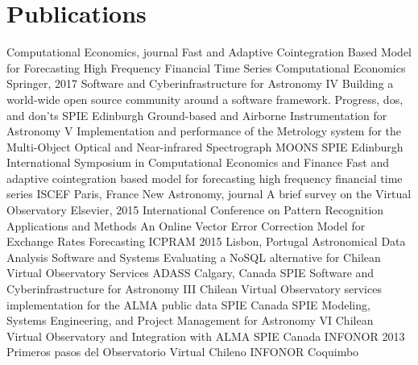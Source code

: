 \documentclass[11pt,a4paper]{moderncv}
\begin{document}
\section{Publications}
	{Computational Economics, journal}
	{Fast and Adaptive Cointegration Based Model for Forecasting High Frequency Financial Time Series}
	{Computational Economics}
	{Springer, 2017}
	{}
	{Software and Cyberinfrastructure for Astronomy IV}
	{Building a world-wide open source community around a software framework. Progress, dos, and don'ts}
	{SPIE}
	{Edinburgh}
	{}
	{Ground-based and Airborne Instrumentation for Astronomy V}
	{Implementation and performance of the Metrology system for the Multi-Object Optical and Near-infrared Spectrograph MOONS}
	{SPIE}
	{Edinburgh}
	{}
	{International Symposium in Computational Economics and Finance}
	{Fast and adaptive cointegration based model for forecasting high frequency financial time series}
	{ISCEF}
	{Paris, France}
	{}
	{New Astronomy, journal}
	{A brief survey on the Virtual Observatory}
	{Elsevier, 2015}
	{}
	{}
	{International Conference on Pattern Recognition Applications and Methods}
	{An Online Vector Error Correction Model for Exchange Rates Forecasting}
	{ICPRAM 2015}
	{Lisbon, Portugal}
	{}
	{Astronomical Data Analysis Software and Systems }
	{Evaluating a NoSQL alternative for Chilean Virtual Observatory Services}
	{ADASS}
	{Calgary, Canada}
	{}
	{SPIE Software and Cyberinfrastructure for Astronomy III}
	{Chilean Virtual Observatory services implementation for the ALMA public data}
	{SPIE}
	{Canada}
	{}
	{SPIE Modeling, Systems Engineering, and Project Management for Astronomy VI}
	{Chilean Virtual Observatory and Integration with ALMA}
	{SPIE}
	{Canada}
	{}
	{INFONOR 2013}
	{Primeros pasos del Observatorio Virtual Chileno}
	{INFONOR}
	{Coquimbo}
	{}
\end{document}
